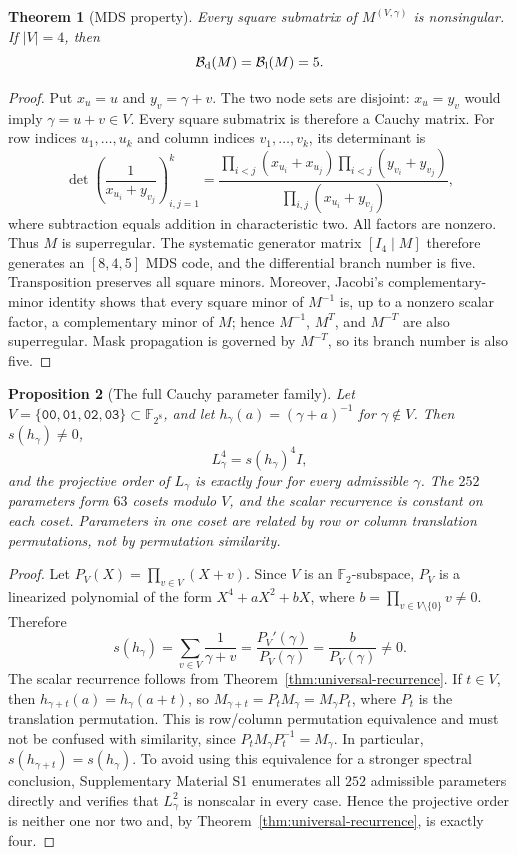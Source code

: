 \documentclass[10pt,reqno]{amsart}
\theoremstyle{plain}
\newtheorem{theorem}{Theorem}[section]
\newtheorem{proposition}[theorem]{Proposition}
\theoremstyle{remark}\newtheorem{remark}[theorem]{Remark}
\theoremstyle{definition}\newtheorem{definition}[theorem]{Definition}
\newcommand{\F}{\mathbb F}
\newcommand{\Bn}{\mathcal B}
\begin{document}
\begin{theorem}[MDS property]\label{thm:mds}
Every square submatrix of $M^{(V,\gamma)}$ is nonsingular. If $|V|=4$, then
\[
\Bn_{\rm d}(M)=\Bn_{\rm l}(M)=5.
\]
\end{theorem}
\begin{proof}
Put $x_u=u$ and $y_v=\gamma+v$. The two node sets are disjoint: $x_u=y_v$ would imply $\gamma=u+v\in V$. Every square submatrix is therefore a Cauchy matrix. For row indices $u_1,\ldots,u_k$ and column indices $v_1,\ldots,v_k$, its determinant is
\begin{equation}
\det\left(\frac1{x_{u_i}+y_{v_j}}\right)_{i,j=1}^k
=
\frac{\prod_{i<j}(x_{u_i}+x_{u_j})\prod_{i<j}(y_{v_i}+y_{v_j})}
{\prod_{i,j}(x_{u_i}+y_{v_j})},
\end{equation}
where subtraction equals addition in characteristic two. All factors are nonzero. Thus $M$ is superregular.  The systematic generator matrix $[I_4\mid M]$ therefore generates an $[8,4,5]$ MDS code, and the differential branch number is five.  Transposition preserves all square minors.  Moreover, Jacobi's complementary-minor identity shows that every square minor of $M^{-1}$ is, up to a nonzero scalar factor, a complementary minor of $M$; hence $M^{-1}$, $M^T$, and $M^{-T}$ are also superregular.  Mask propagation is governed by $M^{-T}$, so its branch number is also five. \end{proof}

\begin{proposition}[The full Cauchy parameter family]\label{prop:gamma-family}
Let \(V=\{\mathtt{00},\mathtt{01},\mathtt{02},\mathtt{03}\}\subset\F_{2^8}\), and let
\(h_\gamma(a)=(\gamma+a)^{-1}\) for \(\gamma\notin V\).  Then \(s(h_\gamma)\ne0\),
\[
L_\gamma^4=s(h_\gamma)^4I,
\]
and the projective order of \(L_\gamma\) is exactly four for every admissible \(\gamma\).  The \(252\) parameters form \(63\) cosets modulo \(V\), and the scalar recurrence is constant on each coset. Parameters in one coset are related by row or column translation permutations, not by permutation similarity.
\end{proposition}
\begin{proof}
Let \(P_V(X)=\prod_{v\in V}(X+v)\).  Since \(V\) is an \(\F_2\)-subspace, \(P_V\) is a linearized polynomial of the form \(X^4+aX^2+bX\), where \(b=\prod_{v\in V\setminus\{0\}}v\ne0\).  Therefore
\[
s(h_\gamma)=\sum_{v\in V}\frac1{\gamma+v}
=\frac{P_V'(\gamma)}{P_V(\gamma)}=\frac{b}{P_V(\gamma)}\ne0.
\]
The scalar recurrence follows from Theorem~\ref{thm:universal-recurrence}. If \(t\in V\), then \(h_{\gamma+t}(a)=h_\gamma(a+t)\), so \(M_{\gamma+t}=P_tM_\gamma=M_\gamma P_t\), where \(P_t\) is the translation permutation. This is row/column permutation equivalence and must not be confused with similarity, since \(P_tM_\gamma P_t^{-1}=M_\gamma\). In particular, \(s(h_{\gamma+t})=s(h_\gamma)\). To avoid using this equivalence for a stronger spectral conclusion, Supplementary Material S1 enumerates all \(252\) admissible parameters directly and verifies that \(L_\gamma^2\) is nonscalar in every case. Hence the projective order is neither one nor two and, by Theorem~\ref{thm:universal-recurrence}, is exactly four.
\end{proof}
\end{document}
